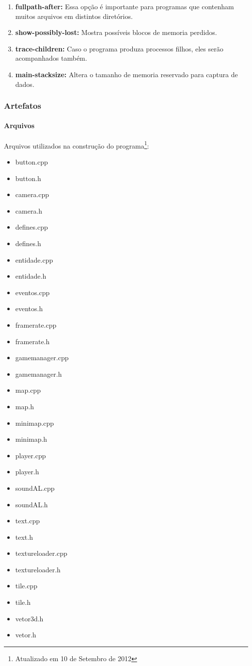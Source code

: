 \begin{enumerate}
	\item \textbf{fullpath-after:} Essa opção é importante para programas que contenham muitos arquivos em distintos diretórios.
	\item \textbf{show-possibly-lost:} Mostra possíveis blocos de memoria perdidos.
	\item \textbf{trace-children:} Caso o programa produza processos filhos, eles serão acompanhados também.
	\item \textbf{main-stacksize:} Altera o tamanho de memoria reservado para captura de dados.
\end{enumerate}

\subsubsection{Artefatos}\label{artefatos}

\paragraph{\textbf{Arquivos}}

Arquivos utilizados na construção do programa\footnote{Atualizado em 10 de Setembro de 2012}:\\

\begin{itemize}
	\item button.cpp
	\item button.h
	\item camera.cpp
	\item camera.h
	\item defines.cpp
	\item defines.h
	\item entidade.cpp
	\item entidade.h
	\item eventos.cpp
	\item eventos.h
	\item framerate.cpp
	\item framerate.h
	\item gamemanager.cpp
	\item gamemanager.h
	\item map.cpp
	\item map.h
	\item minimap.cpp
	\item minimap.h
	\item player.cpp
	\item player.h
	\item soundAL.cpp
	\item soundAL.h
	\item text.cpp
	\item text.h
	\item textureloader.cpp
	\item textureloader.h
	\item tile.cpp
	\item tile.h
	\item vetor3d.h
	\item vetor.h
	
\end{itemize}

